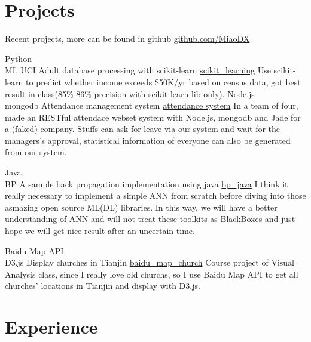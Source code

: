 \documentclass[letterpaper]{twentysecondcv} %
\begin{document}
\section{Projects}
\begin{twenty}
    \twentyitem
        {}
        {Recent projects, more can be found in github}
        {\href{https://github.com/MiaoDX/}{github.com/MiaoDX}}
        {}
  		{}
  	
        
	\twentyitem
		{Python \\ ML}
        {UCI Adult database processing with scikit-learn}
        {\href{https://github.com/MiaoDX/scikit\_learning/}{scikit\_learning}}
        {}
        {Use scikit-learn to predict whether income exceeds \$50K/yr based on census data, got best result in class(85\%-86\% precision with scikit-learn lib only).}
	\twentyitem
		{Node.js \\ mongodb}
		{Attendance management system}
		{\href{https://github.com/SEAPC2016/attendance}{attendance system}}
		{}
		{In a team of four, made an RESTful attendace webset system with Node.js, mongodb and Jade for a (faked) company. Stuffs can ask for leave via our system and wait for the managers's approval, statistical information of everyone can also be generated from our system.}
		
	\twentyitem
		{Java \\ BP}
		{A sample back propagation implementation using java}
		{\href{https://github.com/MiaoDX/bp_java}{bp\_java}}
		{}				
		{I think it really necessary to implement a simple ANN from scratch before diving into those asmazing open source ML(\/DL) libraries. In this way, we will have a better understanding of ANN and will not treat these toolkits as BlackBoxes and just hope we will get nice result after an uncertain time.}
		
	\twentyitem
		{Baidu Map API  \\ D3.js}
		{Display churches in Tianjin}
		{\href{https://github.com/MiaoDX/baidu\_map\_church}{baidu\_map\_church}}	
		{}
		{Course project of Visual Analysis class, since I really love old churchs, so I use Baidu Map API to get all churches' locations in Tianjin and display with D3.js.}	
\end{twenty}


\section{Experience}
\end{document}
